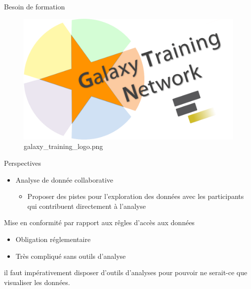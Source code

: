 \documentclass[ignorenonframetext,]{beamer}
\providecommand{\tightlist}{%
  \setlength{\itemsep}{0pt}\setlength{\parskip}{0pt}}
\begin{document}
\begin{frame}{Besoin de formation}

\begin{figure}
\centering
\includegraphics{"figures/galaxy_training_logo.png"}
\caption{galaxy\_training\_logo.png}
\end{figure}

\end{frame}

\begin{frame}{Perspectives}

\begin{itemize}
\tightlist
\item
  Analyse de donnée collaborative

  \begin{itemize}
  \tightlist
  \item
    Proposer des pistes pour l'exploration des données avec les
    participants qui contribuent directement à l'analyse
  \end{itemize}
\end{itemize}

\end{frame}

\begin{frame}{Mise en conformité par rapport aux rêgles d'accès aux
données}

\begin{itemize}
\tightlist
\item
  Obligation réglementaire
\item
  Très compliqué sans outils d'analyse
\end{itemize}

\end{frame}

\begin{frame}{}

il faut impérativement disposer d'outils d'analyses pour pouvoir ne
serait-ce que visualiser les données.

\end{frame}
\end{document}
